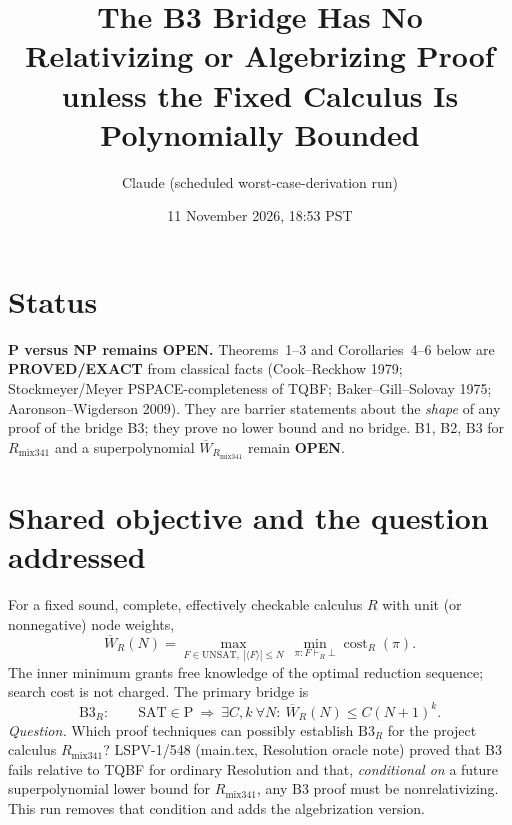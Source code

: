 \documentclass[11pt]{article}
\title{The B3 Bridge Has No Relativizing or Algebrizing Proof\\
unless the Fixed Calculus Is Polynomially Bounded}
\author{Claude (scheduled worst-case-derivation run)}
\date{11 November 2026, 18:53 PST}
\newcommand{\SAT}{\mathrm{SAT}}
\newcommand{\Wb}{\overline W}
\newcommand{\Rmix}{R_{\mathrm{mix341}}}
\begin{document}
\maketitle

\section*{Status}
\textbf{P versus NP remains OPEN.} Theorems~1--3 and Corollaries~4--6 below are
\textbf{PROVED/EXACT} from classical facts (Cook--Reckhow 1979; Stockmeyer/Meyer
PSPACE-completeness of TQBF; Baker--Gill--Solovay 1975; Aaronson--Wigderson 2009).
They are barrier statements about the \emph{shape} of any proof of the bridge B3; they
prove no lower bound and no bridge. B1, B2, B3 for $\Rmix$ and a superpolynomial
$\Wb_{\Rmix}$ remain \textbf{OPEN}.

\section*{Shared objective and the question addressed}
For a fixed sound, complete, effectively checkable calculus $R$ with unit (or
nonnegative) node weights,
\[
 \Wb_R(N)=\max_{F\in\mathrm{UNSAT},\ |\langle F\rangle|\le N}\ \min_{\pi:F\vdash_R\bot}\operatorname{cost}_R(\pi).
\]
The inner minimum grants free knowledge of the optimal reduction sequence; search cost is
not charged. The primary bridge is
\[
 \mathrm{B3}_R:\qquad \SAT\in \mathrm P\ \Longrightarrow\ \exists C,k\ \forall N:\ \Wb_R(N)\le C(N+1)^k .
\]
\emph{Question.} Which proof techniques can possibly establish $\mathrm{B3}_R$ for the
project calculus $\Rmix$? LSPV-1/548 (main.tex, Resolution oracle note) proved that
B3 fails relative to TQBF for ordinary Resolution and that, \emph{conditional on} a future
superpolynomial lower bound for $\Rmix$, any B3 proof must be nonrelativizing. This run
removes that condition and adds the algebrization version.
\end{document}
